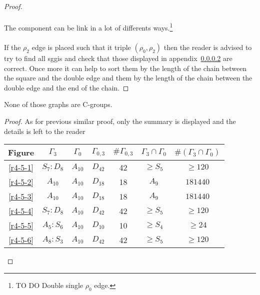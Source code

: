 \begin{proof}
\begin{figure}[H]
\begin{center}
\begin{tikzpicture}[scale=.8]
      \end{tikzpicture}
      \caption{}
    \end{center}
  \end{figure}

  \paragraph{}
  The component can be link in a lot of differents ways.\footnote{TO DO Double single $\rho_0$ edge.}

  \paragraph{}
  If the $\rho_2$ edge is placed such that it triple $(\rho_0, \rho_2)$ then the reader is advised to try to find all sggis and check that those displayed in appendix~\ref{} are correct. Once more it can help to sort them by the length of the chain between the square and the double edge and them by the length of the chain between the double edge and the end of the chain.

\end{proof}

\begin{theorem}
  None of those graphs are C-groups.
\end{theorem}

\begin{proof}
  As for previous similar proof, only the summary is displayed and the details is left to the reader

  \begin{table}[H]
    \centering
    \begin{tabular}{|c|c|c|c|c|c|c|}
      \hline
      Figure & $\Gamma_3$ & $\Gamma_0$ & $\Gamma_{0,3}$ & $\#\Gamma_{0,3}$ & $\Gamma_3 \cap \Gamma_0$ & $\#(\Gamma_3 \cap \Gamma_0)$ \\ \hline

      \ref{r4-5-1} & $S_7 : D_8$ & $A_{10}$ & $D_{42}$ & 42 & $\ge S_5$ & $\ge 120$ \\ \hline
      \ref{r4-5-2} & $A_{10}$ & $A_{10}$ & $D_{18}$ & 18 & $A_9$ & $181440$ \\ \hline
      \ref{r4-5-3} & $A_{10}$ & $A_{10}$ & $D_{18}$ & 18 & $A_9$ & $181440$ \\ \hline
      \ref{r4-5-4} & $S_7 : D_8$ & $A_{10}$ & $D_{42}$ & 42 & $\ge S_5$ & $\ge 120$ \\ \hline
      \ref{r4-5-5} & $A_5 : S_6$ & $A_{10}$ & $D_{10}$ & 10 & $\ge S_4$ & $\ge 24$ \\ \hline
      \ref{r4-5-6} & $A_8 : S_3$ & $A_{10}$ & $D_{42}$ & 42 & $\ge S_5$ & $\ge 120$ \\ \hline

    \end{tabular}
  \end{table}
\end{proof}
